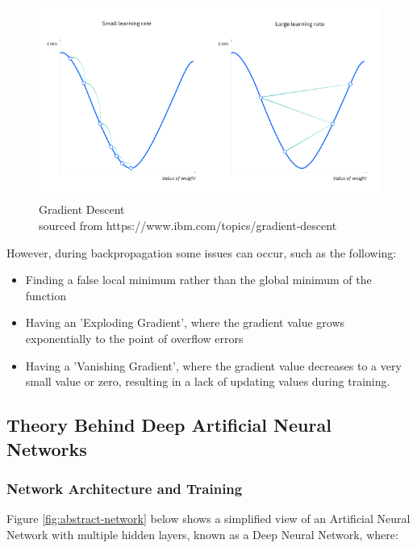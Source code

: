 \documentclass[./project-report/src/latex/project-report.tex]{subfiles}
\begin{document}
\begin{figure}[h!]
\centering
\includegraphics[width=1\textwidth]{./project-report/src/images/gradient-descent.png}
\caption{Gradient Descent\\
        sourced from https://www.ibm.com/topics/gradient-descent}
\end{figure}

\pagebreak

However, during backpropagation some issues can occur, such as the following:

\begin{itemize}
    \item Finding a false local minimum rather than the global minimum of the function
    \item Having an 'Exploding Gradient', where the gradient value grows exponentially to the point of overflow errors
    \item Having a 'Vanishing Gradient', where the gradient value decreases to a very small value or zero, resulting in a lack of updating values during training.
\end{itemize}

\vspace{5mm}
\subsection{Theory Behind Deep Artificial Neural Networks}
\vspace{5mm}

\subsubsection{Network Architecture and Training}

Figure \ref{fig:abstract-network} below shows a simplified view of an Artificial Neural Network with multiple hidden layers, known as a Deep Neural Network, where:
\end{document}
